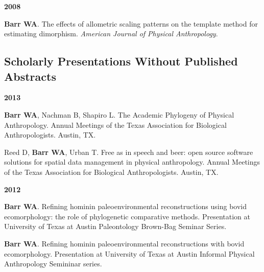 \documentclass{article}
\begin{document}
\begin{description*}
\begin{minipage}{\linewidth}
\item[] {\bfseries 2008}
\item[] {\bfseries Barr WA}. The effects of allometric scaling patterns on the template method for estimating dimorphism. \emph{American Journal of Physical Anthropology}.
\end{minipage}
\end{description*}

\subsection*{Scholarly Presentations Without Published Abstracts}


\begin{description*}
\begin{minipage}{\linewidth}
\item[] {\bfseries 2013}
\item[] {\bfseries Barr WA}, Nachman B, Shapiro L. The Academic Phylogeny of Physical Anthropology. Annual Meetings of the Texas Association for Biological Anthropologists. Austin, TX.

\item[] Reed D, {\bfseries Barr WA}, Urban T. Free as in speech and beer: open source software solutions for spatial data management in physical anthropology. Annual Meetings of the Texas Association for Biological Anthropologists. Austin, TX.
\end{minipage}
\end{description*}



\begin{description*}
\begin{minipage}{\linewidth}
\item[] {\bfseries 2012}
\item[] {\bfseries Barr WA}. Refining hominin paleoenvironmental reconstructions using bovid ecomorphology: the role of phylogenetic comparative methods. Presentation at University of Texas at Austin Paleontology Brown-Bag Seminar Series.

\item[] {\bfseries Barr WA}. Refining hominin paleoenvironmental reconstructions with bovid ecomorphology. Presentation at University of Texas at Austin Informal Physical Anthropology Semininar series.
\end{minipage}
\end{description*}
\end{document}
